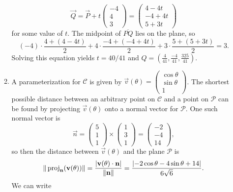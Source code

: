 \begin{enumerate}
\begin{enumerate}
\begin{equation*}
\overrightarrow{Q} = \overrightarrow{P} + t\begin{pmatrix} -4 \\ 4 \\ 3 \end{pmatrix} = \begin{pmatrix} 4 - 4t \\ -4 + 4t \\ 5 + 3t \end{pmatrix}
\end{equation*}
for some value of $t$. The midpoint of $\overline{PQ}$ lies on the plane, so
\begin{equation*}
(-4)\cdot\frac{4 + (4 - 4t)}{2} + 4\cdot\frac{-4 + (-4 + 4t)}{2} + 3\cdot\frac{5 + (5 + 3t)}{2} = 3.
\end{equation*}
Solving this equation yields $t = 40/41$ and $\displaystyle Q = \left(\frac{4}{41}, \frac{-4}{41}, \frac{325}{41}\right)$.
\item A parameterization for $\mathcal{C}$ is given by $\vec{v}(\theta) = \begin{pmatrix} \cos\theta \\ \sin\theta\\ 1 \end{pmatrix}$. The shortest possible distance between an arbitrary point on $\mathcal{C}$ and a point on $\mathcal{P}$ can be found by projecting $\vec{v}(\theta)$ onto a normal vector for $\mathcal{P}$. One such normal vector is
\begin{equation*}
\vec{n} = \begin{pmatrix} 5 \\ 1 \\ 1 \end{pmatrix}\times\begin{pmatrix} 1 \\ 3 \\ 1 \end{pmatrix} = \begin{pmatrix} -2 \\ -4 \\ 14 \end{pmatrix},
\end{equation*}
so then the distance between $\vec{v}(\theta)$ and the plane $\mathcal{P}$ is
\begin{equation*}
\|\operatorname{proj}_{\mathbf{n}}(\mathbf{v}(\theta))\| = \frac{\lvert\mathbf{v}(\theta)\cdot\mathbf{n}\rvert}{\|\mathbf{n}\|} = \frac{\lvert -2\cos\theta - 4\sin\theta + 14\rvert}{6\sqrt{6}}.
\end{equation*}
We can write
\begin{equation*}

\end{equation*}
\end{enumerate}
\end{enumerate}
